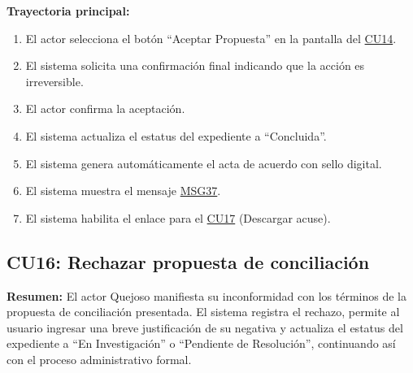 \begin{appendices}
\textbf{Trayectoria principal:}
\begin{enumerate}[nosep]
    \item El actor selecciona el botón ``Aceptar Propuesta'' en la pantalla del \hyperlink{anexo:casos_uso}{CU14}.
    \item El sistema solicita una confirmación final indicando que la acción es irreversible.
    \item El actor confirma la aceptación.
    \item El sistema actualiza el estatus del expediente a ``Concluida''.
    \item El sistema genera automáticamente el acta de acuerdo con sello digital.
    \item El sistema muestra el mensaje \hyperlink{msg:MSG37}{MSG37}.
    \item El sistema habilita el enlace para el \hyperlink{anexo:casos_uso}{CU17} (Descargar acuse).
\end{enumerate}

\subsection{CU16: Rechazar propuesta de conciliación}

\textbf{Resumen:} 
El actor Quejoso manifiesta su inconformidad con los términos de la propuesta de conciliación presentada. El sistema registra el rechazo, permite al usuario ingresar una breve justificación de su negativa y actualiza el estatus del expediente a ``En Investigación'' o ``Pendiente de Resolución'', continuando así con el proceso administrativo formal.


\end{appendices}
